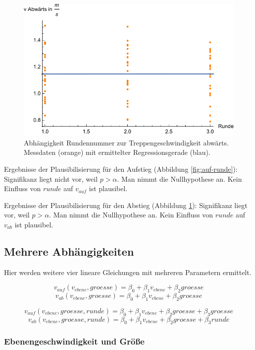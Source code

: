 \begin{figure} \centering 
	\includegraphics[]{abbildungen/regression/2017/ab-runde.pdf}
	
	\caption{Abhängigkeit Rundennummer zur Treppengeschwindigkeit abwärts. Messdaten (orange) mit ermittelter Regressionsgerade (blau). \label{fig:ab-runde}}
\end{figure}

Ergebnisse der Plausibilisierung für den Aufstieg
(Abbildung \ref{fig:auf-runde}):
Signifikanz liegt nicht vor, weil $p > \alpha$. Man nimmt die
Nullhypothese an. Kein Einfluss von $runde$ auf $v_{auf}$ ist plausibel.

Ergebnisse der Plausibilisierung für den Abstieg
(Abbildung \ref{fig:ab-runde}):
Signifikanz liegt vor, weil $p > \alpha$. Man nimmt die
Nullhypothese an. Kein Einfluss von $runde$ auf $v_{ab}$ ist plausibel.

\subsection{Mehrere Abhängigkeiten}

Hier werden weitere vier lineare Gleichungen mit mehreren Parametern ermittelt.

\[v_{auf}(v_{ebene}, groesse) = \beta_0 + \beta_1 v_{ebene} + \beta_2 groesse\]
\[v_{ab}(v_{ebene}, groesse) = \beta_0 + \beta_1 v_{ebene} + \beta_2 groesse\]

\[v_{auf}(v_{ebene}, groesse, runde) = \beta_0 + \beta_1 v_{ebene} + \beta_2 groesse + \beta_3 groesse\]
\[v_{ab}(v_{ebene}, groesse, runde) = \beta_0 + \beta_1 v_{ebene} + \beta_2 groesse + \beta_3 runde\]

\subsubsection{Ebenengeschwindigkeit und Größe}


